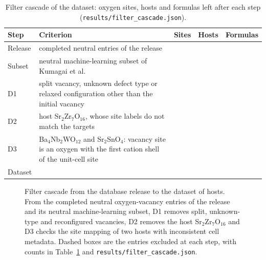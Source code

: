 \begin{table}[H]
\caption{Filter cascade of the dataset: oxygen sites, hosts and formulas left after each step (\texttt{results/filter\_cascade.json}).\label{tab:app_cascade}}
\centering
\small
\begin{tabularx}{\linewidth}{lXrrr}
\toprule
Step & Criterion & Sites & Hosts & Formulas \\
\midrule
Release & completed neutral entries of the release & \numFilterCascadeStepsReleaseSites{} & \numFilterCascadeStepsReleaseHosts{} & \numFilterCascadeStepsReleaseFormulas{} \\
Subset & neutral machine-learning subset of Kumagai et al. & \numFilterCascadeStepsMlSubsetSites{} & \numFilterCascadeStepsMlSubsetHosts{} & \numFilterCascadeStepsMlSubsetFormulas{} \\
D1 & split vacancy, unknown defect type or relaxed configuration other than the initial vacancy & \numFilterCascadeStepsDOneSites{} & \numFilterCascadeStepsDOneHosts{} & \numFilterCascadeStepsDOneFormulas{} \\
D2 & host Sr$_2$Zr$_7$O$_{16}$, whose site labels do not match the targets & \numFilterCascadeStepsDTwoSites{} & \numFilterCascadeStepsDTwoHosts{} & \numFilterCascadeStepsDTwoFormulas{} \\
D3 & Ba$_4$Nb$_2$WO$_{12}$ and Sr$_2$SnO$_4$: vacancy site is an oxygen with the first cation shell of the unit-cell site & \numFilterCascadeStepsDThreeSites{} & \numFilterCascadeStepsDThreeHosts{} & \numFilterCascadeStepsDThreeFormulas{} \\
\midrule
Dataset & & \numFilterCascadeStepsFinalSites{} & \numFilterCascadeStepsFinalHosts{} & \numFilterCascadeStepsFinalFormulas{} \\
\bottomrule
\end{tabularx}
\end{table}

\begin{figure}[H]
\centering
{}
\caption{Filter cascade from the database release to the dataset of \numFilterCascadeStepsFinalHosts{} hosts. From the completed neutral oxygen-vacancy entries of the release and its neutral machine-learning subset, D1 removes split, unknown-type and reconfigured vacancies, D2 removes the host Sr$_2$Zr$_7$O$_{16}$ and D3 checks the site mapping of two hosts with inconsistent cell metadata. Dashed boxes are the entries excluded at each step, with counts in Table~\ref{tab:app_cascade} and \texttt{results/filter\_cascade.json}.\label{fig:app_cascade}}
\end{figure}

